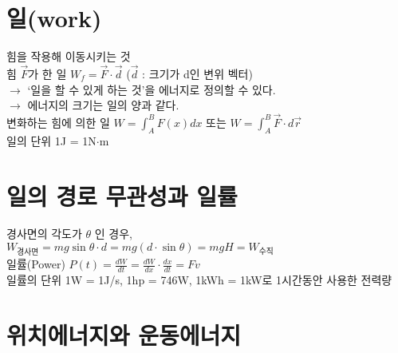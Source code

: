 \documentclass[10pt,a4paper]{report}
\begin{document}
	\section{일(work)}
	
	힘을 작용해 이동시키는 것\\
	힘 $\vec{F}$가 한 일 $W_f = \vec{F} \cdot \vec{d}$ ($\vec{d}$ : 크기가 d인 변위 벡터)\\
	$\rightarrow$ `일을 할 수 있게 하는 것'을 에너지로 정의할 수 있다.\\
	$\rightarrow$ 에너지의 크기는 일의 양과 같다.\\
	변화하는 힘에 의한 일 $W = \int_A^B F(x) dx$ 또는 $W = \int_A^B \vec{F} \cdot d\vec{r}$\\
	일의 단위 1J = 1N$\cdot$m
	
	\section{일의 경로 무관성과 일률}
	
	경사면의 각도가 $\theta$ 인 경우,\\
	$W_{경사면} = mg \sin \theta \cdot d = mg(d \cdot \sin \theta) = mgH = W_{수직}$\\
	일률(Power) $P(t) = \frac{dW}{dt} = \frac{dW}{dx} \cdot \frac{dx}{dt} = Fv$\\
	일률의 단위 1W = 1J/s, 1hp = 746W, 1kWh = 1kW로 1시간동안 사용한 전력량
	
	\section{위치에너지와 운동에너지}
	
\end{document}
